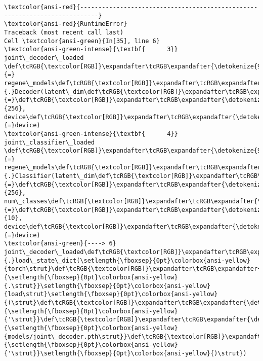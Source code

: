 \documentclass[11pt]{article}
\begin{document}
    \begin{Verbatim}[commandchars=\\\{\}, frame=single, framerule=2mm, rulecolor=\color{outerrorbackground}]
\textcolor{ansi-red}{---------------------------------------------------------------------------}
\textcolor{ansi-red}{RuntimeError}                              Traceback (most recent call last)
Cell \textcolor{ansi-green}{In[35], line 6}
\textcolor{ansi-green-intense}{\textbf{      3}} joint\_decoder\_loaded \def\tcRGB{\textcolor[RGB]}\expandafter\tcRGB\expandafter{\detokenize{98,98,98}}{=} regene\_models\def\tcRGB{\textcolor[RGB]}\expandafter\tcRGB\expandafter{\detokenize{98,98,98}}{.}Decoder(latent\_dim\def\tcRGB{\textcolor[RGB]}\expandafter\tcRGB\expandafter{\detokenize{98,98,98}}{=}\def\tcRGB{\textcolor[RGB]}\expandafter\tcRGB\expandafter{\detokenize{98,98,98}}{256}, device\def\tcRGB{\textcolor[RGB]}\expandafter\tcRGB\expandafter{\detokenize{98,98,98}}{=}device)
\textcolor{ansi-green-intense}{\textbf{      4}} joint\_classifier\_loaded \def\tcRGB{\textcolor[RGB]}\expandafter\tcRGB\expandafter{\detokenize{98,98,98}}{=} regene\_models\def\tcRGB{\textcolor[RGB]}\expandafter\tcRGB\expandafter{\detokenize{98,98,98}}{.}Classifier(latent\_dim\def\tcRGB{\textcolor[RGB]}\expandafter\tcRGB\expandafter{\detokenize{98,98,98}}{=}\def\tcRGB{\textcolor[RGB]}\expandafter\tcRGB\expandafter{\detokenize{98,98,98}}{256}, num\_classes\def\tcRGB{\textcolor[RGB]}\expandafter\tcRGB\expandafter{\detokenize{98,98,98}}{=}\def\tcRGB{\textcolor[RGB]}\expandafter\tcRGB\expandafter{\detokenize{98,98,98}}{10}, device\def\tcRGB{\textcolor[RGB]}\expandafter\tcRGB\expandafter{\detokenize{98,98,98}}{=}device)
\textcolor{ansi-green}{----> 6} joint\_decoder\_loaded\def\tcRGB{\textcolor[RGB]}\expandafter\tcRGB\expandafter{\detokenize{98,98,98}}{.}load\_state\_dict(\setlength{\fboxsep}{0pt}\colorbox{ansi-yellow}{torch\strut}\def\tcRGB{\textcolor[RGB]}\expandafter\tcRGB\expandafter{\detokenize{98,98,98}}{\setlength{\fboxsep}{0pt}\colorbox{ansi-yellow}{.\strut}}\setlength{\fboxsep}{0pt}\colorbox{ansi-yellow}{load\strut}\setlength{\fboxsep}{0pt}\colorbox{ansi-yellow}{(\strut}\def\tcRGB{\textcolor[RGB]}\expandafter\tcRGB\expandafter{\detokenize{175,0,0}}{\setlength{\fboxsep}{0pt}\colorbox{ansi-yellow}{'\strut}}\def\tcRGB{\textcolor[RGB]}\expandafter\tcRGB\expandafter{\detokenize{175,0,0}}{\setlength{\fboxsep}{0pt}\colorbox{ansi-yellow}{models/joint\_decoder.pth\strut}}\def\tcRGB{\textcolor[RGB]}\expandafter\tcRGB\expandafter{\detokenize{175,0,0}}{\setlength{\fboxsep}{0pt}\colorbox{ansi-yellow}{'\strut}}\setlength{\fboxsep}{0pt}\colorbox{ansi-yellow}{)\strut})

\end{Verbatim}
\end{document}
